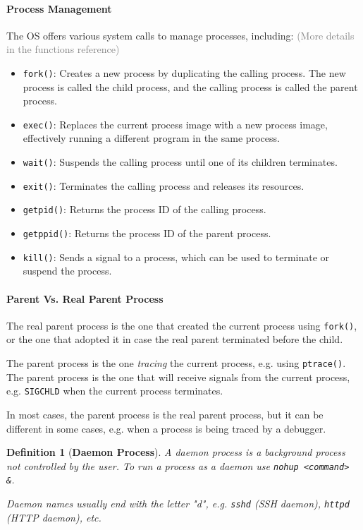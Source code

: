 \documentclass[openany,12pt]{book}
\newtheorem*{definition}{Definition}
\newcommand{\code}[1]{\texttt{#1}}
\newcommand{\gray}[1]{\textcolor{gray}{#1}}
\begin{document}
\paragraph{Process Management} The OS offers various system calls to manage processes, including: \gray{(More details in the functions reference)}
\begin{itemize}
    \item \texttt{fork()}: Creates a new process by duplicating the calling process. The new process is called the child process, and the calling process is called the parent process.
    \item \texttt{exec()}: Replaces the current process image with a new process image, effectively running a different program in the same process.
    \item \texttt{wait()}: Suspends the calling process until one of its children terminates.
    \item \texttt{exit()}: Terminates the calling process and releases its resources.
    \item \texttt{getpid()}: Returns the process ID of the calling process.
    \item \texttt{getppid()}: Returns the process ID of the parent process.
    \item \texttt{kill()}: Sends a signal to a process, which can be used to terminate or suspend the process.
\end{itemize}

\paragraph{Parent Vs. Real Parent Process}
The real parent process is the one that created the current process using \code{fork()}, or the one that adopted it in case the real parent terminated before the child.

The parent process is the one \textit{tracing} the current process, e.g. using \code{ptrace()}. The parent process is the one that will receive signals from the current process, e.g. \texttt{SIGCHLD} when the current process terminates.

In most cases, the parent process is the real parent process, but it can be different in some cases, e.g. when a process is being traced by a debugger.



\begin{definition}
    [\textbf{Daemon Process}]
    A daemon process is a background process not controlled by the user.
    To run a process as a daemon use \code{nohup <command> \&}.

    Daemon names usually end with the letter "d", e.g. \texttt{sshd} (SSH daemon), \texttt{httpd} (HTTP daemon), etc.
\end{definition}
\end{document}
